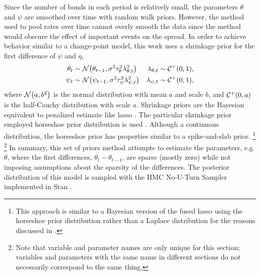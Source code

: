\documentclass[]{article}\usepackage[]{graphicx}\usepackage[]{color}
\begin{document}
Since the number of bonds in each period is relatively small, the parameters $\theta$ and $\psi$ are smoothed over time with random walk priors.
However, the method used to pool rates over time cannot overly smooth the data since the method would obscure the effect of important events on the spread.
In order to achieve behavior similar to a change-point model, this work uses a shrinkage prior for the first difference of $\psi$ and $\eta$,
\begin{align}
  \theta_{t} & \sim \mathcal{N}\mathopen{}\left(\theta_{t-1}, \sigma^{2} \tau_{\theta}^{2} \lambda_{\theta,t}^{2}\right)\mathclose{}
  & \lambda_{\theta,t} & \sim \mathcal{C^+}\mathopen{}\left(0, 1\right)\mathclose{} \text{,} \\
  \psi_{t} & \sim \mathcal{N}\mathopen{}\left(\psi_{t-1}, \sigma^{2} \tau_{\psi}^{2} \lambda_{\psi,t}^{2}\right)\mathclose{}
  & \lambda_{\psi,t} & \sim \mathcal{C^+}\mathopen{}\left(0, 1\right)\mathclose{} \text{,}
\end{align}
where $\mathcal{N}\mathopen{}\left(a, b^{2}\right)\mathclose{}$ is the normal distribution with mean $a$ and scale $b$, and $\mathcal{C^+}\mathopen{}\left(0, a\right)\mathclose{}$ is the half-Cauchy distribution with scale $a$.%
Shrinkage priors are the Bayesian equivalent to penalized estimate like lasso \parencites{Tibshirani1996}{ParkCasella2008}.
The particular shrinkage prior employed horseshoe prior distribution is used \parencites{CarvalhoPolsonScott2009}{CarvalhoPolsonScott2009}.
Although a continuous distribution, the horseshoe prior has properties similar to a spike-and-slab prior.%
\footnote{This approach is similar to a Bayesian version of the fused lasso \textcite{TibshiraniEtAl2005} using the horseshoe prior distribution rather than a Laplace distribution for the reasons discussed in \parencites{CarvalhoPolsonScott2009}{CarvalhoPolsonScott2009}.}
\footnote{Note that variable and parameter names are only unique for this section; variables and parameters with the same name in different sections do not necessarily correspond to the same thing.}
In summary, this set of priors method attempts to estimate the parameters, e.g. $\theta$, where the first differences, $\theta_{t} - \theta_{t-1}$, are sparse (mostly zero) while not imposing assumptions about the sparsity of the differences.
The posterior distribution of this model is sampled with the HMC No-U-Turn Sampler implemented in Stan \parencites{Stan2014}{HoffmanGelman2014a}.
\end{document}
